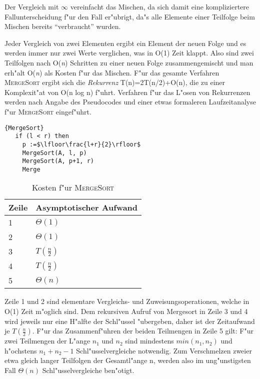 \documentclass[draft,12pt]{scrreprt}
\theoremstyle{break}
\begin{document}
Der Vergleich mit $\infty$ vereinfacht das Mischen, da sich damit eine kompliziertere Fallunterscheidung f"ur den Fall er"ubrigt, 
da"s alle Elemente einer Teilfolge beim Mischen bereits "`verbraucht"' wurden.

Jeder Vergleich von zwei Elementen ergibt ein Element der neuen Folge und es werden immer nur zwei Werte verglichen, was in
O(1) Zeit klappt. Also sind zwei Teilfolgen nach O(\textit{n}) Schritten zu einer neuen Folge zusammengemischt und man erh"alt
O(\textit{n}) als Kosten f"ur das Mischen.
F"ur das gesamte Verfahren \textsc{MergeSort} ergibt sich die \textit{Rekurrenz} T(n)=2T(n/2)+O(n), die zu einer Komplexit"at von O(n
log n) f"uhrt. Verfahren f"ur das L"osen von Rekurrenzen werden nach Angabe des Pseudocodes und einer etwas
formaleren Laufzeitanalyse f"ur \textsc{MergeSort} eingef"uhrt.

%
\begin{Algorithmus}[h]
    \begin{lstlisting}[frame=tlrb, mathescape=true, title=\textsc{MergeSort}, gobble=3]{MergeSort}   
   if (l < r) then
     p :=$\lfloor\frac{l+r}{2}\rfloor$ 
     MergeSort(A, l, p)
     MergeSort(A, p+1, r)
     Merge
    \end{lstlisting}
  \end{Algorithmus}
  
\begin{table}[h]
  \begin{tabular}{*{2}{l}}
    Zeile & Asymptotischer Aufwand\\
    \hline
    1 & $\Theta(1)$\\
    2 & $\Theta(1)$\\
    3 & $T(\frac{n}{2})$\\
    4 & $T(\frac{n}{2})$\\
    5 & $\Theta(n)$\\
  \end{tabular}
  \caption{Kosten f"ur \textsc{MergeSort}} 
\end{table}

Zeile 1 und 2 sind elementare Vergleichs- und Zuweisungsoperationen, welche in O(1) Zeit m"oglich sind. 
Dem rekursiven Aufruf von Mergesort in Zeile 3 und 4 wird jeweils nur eine H"alfte der Schl"ussel "ubergeben, 
daher ist der Zeitaufwand je $T(\frac{n}{2})$. F"ur das Zusammenf"uhren der beiden Teilmengen in Zeile 5 gilt: 
F"ur zwei Teilmengen der L"ange $n_1$ und $n_2$ sind mindestens $min(n_1,n_2)$ und h"ochstens $n_1 + n_2 -1$ Schl"usselvergleiche notwendig. 
Zum Verschmelzen zweier etwa gleich langer Teilfolgen der Gesamtl"ange n, werden also im ung"unstigsten Fall $\Theta(n)$ Schl"usselvergleiche ben"otigt.
\end{document}

